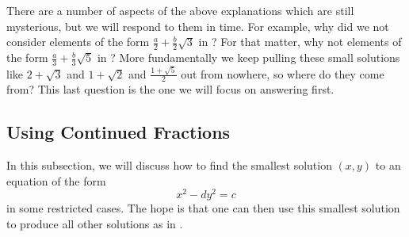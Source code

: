 \documentclass[../notes.tex]{subfiles}
\begin{document}
There are a number of aspects of the above explanations which are still mysterious, but we will respond to them in time. For example, why did we not consider elements of the form $\frac a2+\frac b2\sqrt3$ in ? For that matter, why not elements of the form $\frac a3+\frac b3\sqrt5$ in ? More fundamentally we keep pulling these small solutions like $2+\sqrt3$ and $1+\sqrt2$ and $\frac{1+\sqrt5}2$ out from nowhere, so where do they come from? This last question is the one we will focus on answering first.

\subsection{Using Continued Fractions}
In this subsection, we will discuss how to find the smallest solution $(x,y)$ to an equation of the form
\[x^2-dy^2=c\]
in some restricted cases. The hope is that one can then use this smallest solution to produce all other solutions as in .
\end{document}
